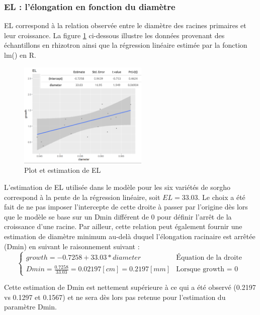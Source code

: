 \subsubsection{EL : l'élongation en fonction du diamètre}

EL correspond à la relation observée entre le diamètre des racines primaires et leur croissance.
La figure \ref{fig:EL} ci-dessous illustre les données provenant des échantillons en rhizotron ainsi que la régression linéaire estimée par la fonction lm() en R.
\newpage

\begin{figure}[ht]
\centering
\includegraphics[width=0.55\textwidth]{Image/EL.png}
\caption{Plot et estimation de EL}
\label{fig:EL}
\end{figure}

L'estimation de EL utilisée dans le modèle pour les six variétés de sorgho correspond à la pente de la régression linéaire, soit $EL= 33.03$.
Le choix a été fait de ne pas imposer l'intercepte de cette droite à passer par l'origine dès lors que le modèle se base sur un Dmin différent de 0 pour définir l'arrêt de la croissance d'une racine.
Par ailleur, cette relation peut également fournir une estimation de diamètre minimum au-delà duquel l'élongation racinaire est arrêtée (Dmin) en suivant le raisonnement suivant :
\begin{equation}
    \begin{cases}
        growth = -0.7258 + 33.03*diameter & \text{Équation de la droite} \\
        Dmin = \frac{0.7258}{33.03} = 0.02197 [cm] = 0.2197 [mm] & \text{Lorsque growth = 0}
    \end{cases}
\end{equation}

Cette estimation de Dmin est nettement supérieure à ce qui a été observé (0.2197 vs 0.1297 et 0.1567) et ne sera dès lors pas retenue pour l'estimation du paramètre Dmin.

